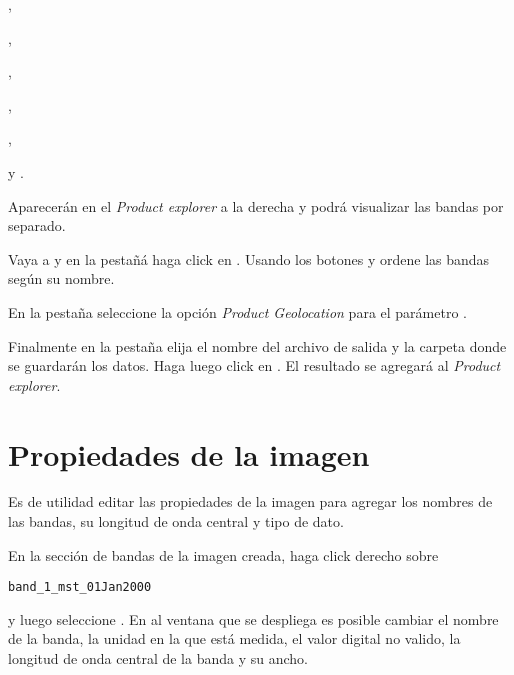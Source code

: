 \begin{center} ,
\end{center}
\begin{center} ,
\end{center}
\begin{center} ,
\end{center}
\begin{center} ,
\end{center}
\begin{center} ,
\end{center}
\begin{center} 
\end{center}
\begin{center} y .
\end{center}

Aparecerán en el \emph{Product explorer} a la derecha y podrá visualizar las bandas por separado.

Vaya a  y en la pestañá  haga click en . Usando los botones  y  ordene las bandas según su nombre.

En la pestaña  seleccione la opción \emph{Product Geolocation} para el parámetro .

Finalmente en la pestaña  elija el nombre del archivo de salida y la carpeta donde se guardarán los datos. Haga luego click en . El resultado se agregará al \emph{Product explorer}.

\section{Propiedades de la imagen}
Es de utilidad editar las propiedades de la imagen para agregar los nombres de las bandas, su longitud de onda central y tipo de dato.

En la sección de bandas de la imagen creada, haga click derecho sobre
\begin{center}
\texttt{band\_1\_mst\_01Jan2000}
\end{center}
y luego seleccione . En al ventana que se despliega es posible cambiar el nombre de la banda, la unidad en la que está medida, el valor digital no valido, la longitud de onda central de la banda y su ancho.


